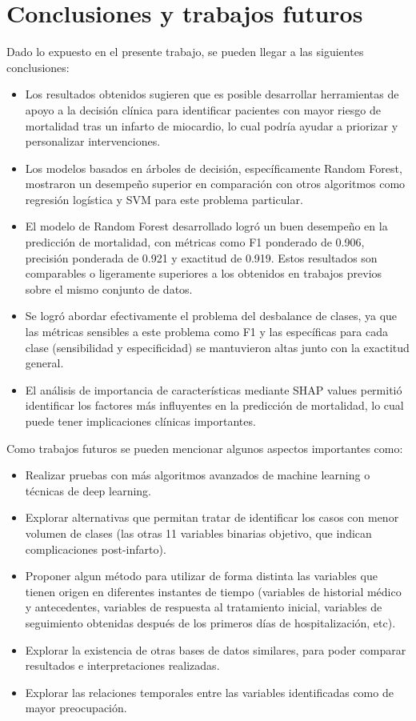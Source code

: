 \documentclass[conference]{IEEEtran}
\begin{document}
\section{\textbf{Conclusiones y trabajos futuros}}
Dado lo expuesto en el presente trabajo, se pueden llegar a las siguientes conclusiones:
\begin{itemize}
    \item Los resultados obtenidos sugieren que es posible desarrollar herramientas de apoyo a la decisión clínica para identificar pacientes con mayor riesgo de mortalidad tras un infarto de miocardio, lo cual podría ayudar a priorizar y personalizar intervenciones.
    \item Los modelos basados en árboles de decisión, específicamente Random Forest, mostraron un desempeño superior en comparación con otros algoritmos como regresión logística y SVM para este problema particular.
    \item El modelo de Random Forest desarrollado logró un buen desempeño en la predicción de mortalidad, con métricas como F1 ponderado de 0.906, precisión ponderada de 0.921 y exactitud de 0.919. Estos resultados son comparables o ligeramente superiores a los obtenidos en trabajos previos sobre el mismo conjunto de datos.
    \item Se logró abordar efectivamente el problema del desbalance de clases, ya que las métricas sensibles a este problema como F1 y las específicas para cada clase (sensibilidad y especificidad) se mantuvieron altas junto con la exactitud general.
    \item El análisis de importancia de características mediante SHAP values permitió identificar los factores más influyentes en la predicción de mortalidad, lo cual puede tener implicaciones clínicas importantes.
\end{itemize}
Como trabajos futuros se pueden mencionar algunos aspectos importantes como:
\begin{itemize}
    \item Realizar pruebas con más algoritmos avanzados de machine learning o técnicas de deep learning.
    \item Explorar alternativas que permitan tratar de identificar los casos con menor volumen de clases (las otras 11 variables binarias objetivo, que indican complicaciones post-infarto).
    \item Proponer algun método para utilizar de forma distinta las variables que tienen origen en diferentes instantes de tiempo (variables de historial médico y antecedentes, variables de respuesta al tratamiento inicial, variables de seguimiento obtenidas después de los primeros días de hospitalización, etc).
    \item Explorar la existencia de otras bases de datos similares, para poder comparar resultados e interpretaciones realizadas.
    \item Explorar las relaciones temporales entre las variables identificadas como de mayor preocupación.
\end{itemize} 
\end{document}
